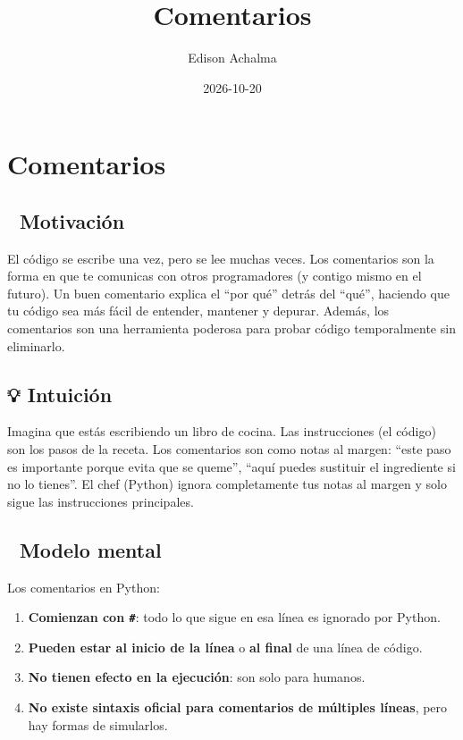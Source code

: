 \documentclass[
  doc,
  floatsintext,
  longtable,
  a4paper,
  nolmodern,
  notxfonts,
  notimes,
  12pt,
  colorlinks=true,linkcolor=blue,citecolor=blue,urlcolor=blue]{apa7}
\title{Comentarios}
\author{Edison Achalma}
\affiliation{
{Escuela Profesional de Economía, Universidad Nacional de San Cristóbal
de Huamanga}}
\date{2026-10-20}
\providecommand{\tightlist}{%
  \setlength{\itemsep}{0pt}\setlength{\parskip}{0pt}}
\begin{document}
\maketitle


\hypertarget{toc}{}
\tableofcontents
\newpage
\section[Introduction]{Comentarios}

\setcounter{secnumdepth}{3}

\setlength\LTleft{0pt}




\subsection{🎯 Motivación}\label{motivaciuxf3n}

El código se escribe una vez, pero se lee muchas veces. Los comentarios
son la forma en que te comunicas con otros programadores (y contigo
mismo en el futuro). Un buen comentario explica el ``por qué'' detrás
del ``qué'', haciendo que tu código sea más fácil de entender, mantener
y depurar. Además, los comentarios son una herramienta poderosa para
probar código temporalmente sin eliminarlo.

\subsection{💡 Intuición}\label{intuiciuxf3n}

Imagina que estás escribiendo un libro de cocina. Las instrucciones (el
código) son los pasos de la receta. Los comentarios son como notas al
margen: ``este paso es importante porque evita que se queme'', ``aquí
puedes sustituir el ingrediente si no lo tienes''. El chef (Python)
ignora completamente tus notas al margen y solo sigue las instrucciones
principales.

\subsection{🧠 Modelo mental}\label{modelo-mental}

Los comentarios en Python:

\begin{enumerate}
\def\labelenumi{\arabic{enumi}.}
\tightlist
\item
  \textbf{Comienzan con \texttt{\#}}: todo lo que sigue en esa línea es
  ignorado por Python.
\item
  \textbf{Pueden estar al inicio de la línea} o \textbf{al final} de una
  línea de código.
\item
  \textbf{No tienen efecto en la ejecución}: son solo para humanos.
\item
  \textbf{No existe sintaxis oficial para comentarios de múltiples
  líneas}, pero hay formas de simularlos.
\end{enumerate}
\end{document}

